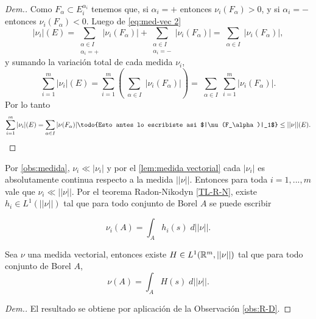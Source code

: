 \begin{proof}[Dem.]
  
  
 
 Como $F_{\alpha}\subset E_i^{\alpha_i}$ tenemos que, si $\alpha_i=+$ entonces $\nu_i(F_\alpha)>0$, y  si $\alpha_i=-$ entonces $\nu_i(F_\alpha)<0$. Luego de \eqref{eq:med-vec 2}
  \begin{equation*}
  	|\nu_i|(E)= \sum_{\substack{\alpha\in I\\ \alpha_i=+}}|\nu_i(F_\alpha)|+\sum_{\substack{\alpha\in I\\ \alpha_i=-}}|\nu_i(F_\alpha)|=\sum_{\substack{\alpha\in I}}|\nu_i(F_\alpha)|,
  \end{equation*}
  y sumando la variación total de cada medida $\nu_i$,
   \begin{equation*}
  	\sum_{i=1}^{m}|\nu_i|(E)=\sum_{i=1}^{m}\left( \sum_{\substack{\alpha\in I}}|\nu_i(F_\alpha)|\right) = \sum_{\substack{\alpha\in I}}\sum_{i=1}^{m}|\nu_i(F_\alpha)|.
  \end{equation*}
  Por lo tanto
  \begin{equation*}
  	\sum_{i=1}^{m}|\nu_i|(E)= \sum_{\substack{\alpha\in I}}|\nu(F_\alpha)|\textrm{\todo{Esto antes lo escribiste asi $|\nu(F_\alpha)|_1$}}\leq ||\nu||(E).
  \end{equation*}
  
\end{proof}
\begin{obs}

Por \eqref{obs:medida}, $\nu_i\ll |\nu_i|$ y por el  \ref{lem:medida vectorial} cada $|\nu_i|$ es absolutamente continua respecto a la medida $||\nu||$. Entonces para toda $i=1,..., m$ vale que $\nu_i\ll ||\nu||$.\label{obs:R-D}	Por el teorema Radon-Nikodyn \eqref{TL-R-N}, existe $h_i\in L^1(||\nu||) $ tal que para todo conjunto de Borel $A$ se puede escribir

	$$\nu_i(A)=\int_A h_i(s)\;d||\nu||.$$
 \end{obs}
 \begin{prop}\label{prop:medida vectorial}
Sea  $\nu$ una medida vectorial, entonces  existe $ H\in L^1(\mathbb{R}^m,||\nu||)$ tal que para todo conjunto de Borel $A$, 
    \begin{equation*}
		\nu(A)=\int_A H(s)\;d||\nu||.
	\end{equation*}
 \end{prop}

 \newpage
 
\begin{proof}[Dem.]
    El resultado se obtiene por aplicación de la Observación \eqref{obs:R-D}. 
\end{proof}     

